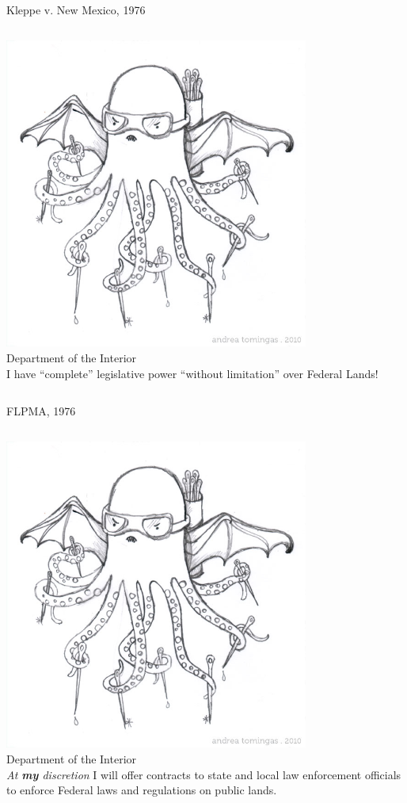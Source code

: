 \begin{frame}{Kleppe v. New Mexico, 1976}
    \begin{columns}[c]
            \centering
            \includegraphics[width=0.75\textwidth]{img/octopus.png} \\
            Department of the Interior \\
        \column{0.5\textheight}
            I have ``complete'' legislative power ``without limitation'' over Federal Lands!
    \end{columns}
\end{frame}

\begin{frame}{FLPMA, 1976}
    \begin{columns}[c]
            \centering
            \includegraphics[width=0.75\textwidth]{img/octopus.png} \\
            Department of the Interior \\
        \column{0.5\textheight}
            \emph{At \textbf{my} discretion} I will offer contracts to state
            and local law enforcement officials to enforce Federal laws and
            regulations on public lands.
    \end{columns}
\end{frame}

